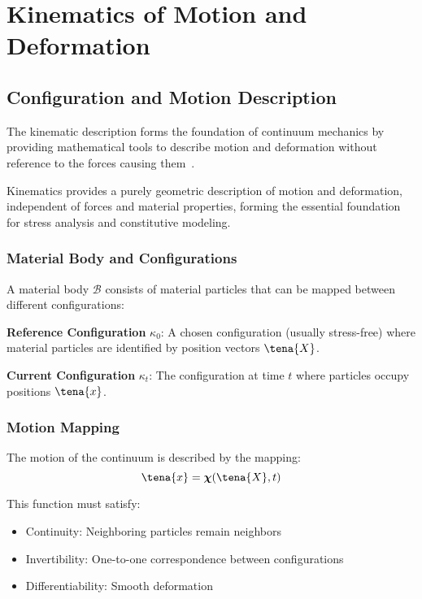 \chapter{Kinematics of Motion and Deformation}

\section{Configuration and Motion Description}

The kinematic description forms the foundation of continuum mechanics by providing mathematical tools to describe motion and deformation without reference to the forces causing them~\autocite{Sadd.2019}.

\begin{keypoint}
Kinematics provides a purely geometric description of motion and deformation, independent of forces and material properties, forming the essential foundation for stress analysis and constitutive modeling.
\end{keypoint}

\subsection{Material Body and Configurations}

A material body $\mathcal{B}$ consists of material particles that can be mapped between different configurations:

\textbf{Reference Configuration} $\kappa_0$: A chosen configuration (usually stress-free) where material particles are identified by position vectors $\tena{X}$.

\textbf{Current Configuration} $\kappa_t$: The configuration at time $t$ where particles occupy positions $\tena{x}$.

\subsection{Motion Mapping}

The motion of the continuum is described by the mapping:
\begin{equation}
\tena{x} = \boldsymbol{\chi}(\tena{X}, t)
\end{equation}

This function must satisfy:
\begin{itemize}
\item Continuity: Neighboring particles remain neighbors
\item Invertibility: One-to-one correspondence between configurations
\item Differentiability: Smooth deformation
\end{itemize}

